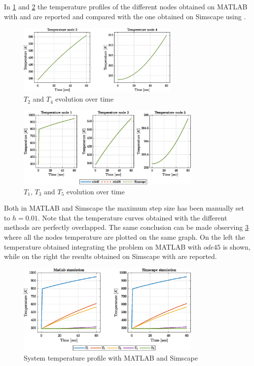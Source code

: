 \documentclass[11pt,a4paper,oneside]{article}
\begin{document}
In \cref{fig:ex1_tempKeyNodes} and \cref{fig:ex1_tempOtherNodes} the temperature profiles of the different nodes obtained on MATLAB with  and  are reported and compared with the one obtained on Simscape using .
\begin{figure}[H]
    \centering
    \includegraphics*[width=0.7\textwidth, keepaspectratio]{Figures/ex1_tempKeyNodes.eps}
    \caption[]{\label{fig:ex1_tempKeyNodes} $T_2$ and $T_4$ evolution over time}
\end{figure}
\begin{figure}[H]
    \centering
    \includegraphics*[width=0.8\textwidth, keepaspectratio]{Figures/ex1_tempOtherNodes.eps}
    \caption[]{\label{fig:ex1_tempOtherNodes} $T_1$, $T_3$ and $T_5$ evolution over time}
\end{figure}

Both in MATLAB and Simscape the maximum step size has been manually set to $h=0.01$.
Note that the temperature curves obtained with the different methods are perfectly overlapped.
The same conclusion can be made observing \cref{fig:ex1_tempCompare} where all the nodes temperature are plotted on the same graph.
On the left the temperature obtained integrating the problem on MATLAB with $ode45$ is shown, while on the right the results obtained on Simscape with  are reported.
\begin{figure}[H]
    \centering
    \includegraphics*[width=0.8\textwidth, keepaspectratio]{Figures/ex1_tempCompare.eps}
    \caption[]{\label{fig:ex1_tempCompare} System temperature profile with MATLAB and Simscape}
\end{figure}
\end{document}
